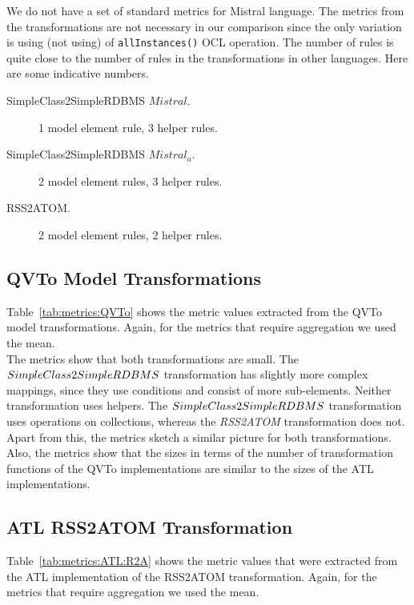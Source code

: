 \documentclass[12pt]{elsarticle}
\begin{document}
We do not have a set of standard metrics for Mistral language. The metrics from
the transformations are not necessary in our comparison since the only variation
is using (not using) of \texttt{allInstances()} OCL operation. The number of rules is quite
close to the number of rules in the transformations in other languages. Here are
some indicative numbers.

\begin{description}
\item[SimpleClass2SimpleRDBMS $Mistral$.] 1 model element rule, 3 helper rules.
\item[SimpleClass2SimpleRDBMS $Mistral_a$.] 2 model element rules, 3 helper
rules.
\item[RSS2ATOM.] 2 model element rules, 2 helper rules.
\end{description}

\subsection{QVTo Model Transformations}
Table~\ref{tab:metrics:QVTo} shows the metric values extracted from the QVTo model transformations.
Again, for the metrics that require aggregation we used the mean.\\



The metrics show that both transformations are small. The
$Simple\-Class\-2\-Simple\-RDBMS$ transformation has slightly more complex
mappings, since they use conditions and consist of more sub-elements. Neither
transformation uses helpers. The $Simple\-Class\-2\-Simple\-RDBMS$
transformation uses operations on collections, whereas the \emph{RSS2ATOM} transformation does
not. Apart from this, the metrics sketch a similar picture for both
transformations. Also, the  metrics show that the sizes in terms of the number
of transformation functions of the QVTo implementations are similar to the sizes
of the ATL implementations.

\subsection{ATL RSS2ATOM Transformation}
Table~\ref{tab:metrics:ATL:R2A} shows the metric values that were extracted from
the ATL implementation of the RSS2ATOM transformation. Again, for the metrics
that require aggregation we used the mean.\\


\end{document}
